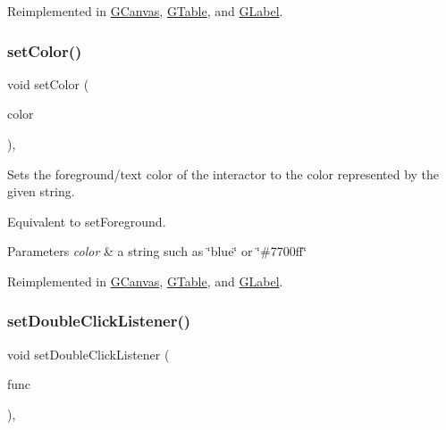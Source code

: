 Reimplemented in \mbox{\hyperlink{classGCanvas_af6e1bcf23a09a0ae0607daff81ee45fa}{G\+Canvas}}, \mbox{\hyperlink{classGTable_a165735fb49fa7db12602d32557cbfe0d}{G\+Table}}, and \mbox{\hyperlink{classGLabel_a165735fb49fa7db12602d32557cbfe0d}{G\+Label}}.

\mbox{\label{classGInteractor_a61374df6c11b52cfbb0815decdbaebc6}} 
\subsubsection{\texorpdfstring{set\+Color()}{setColor()}\hspace{0.1cm}{\footnotesize\ttfamily [2/2]}}
{\footnotesize\ttfamily void set\+Color (\begin{DoxyParamCaption}\item[{const std\+::string \&}]{color }\end{DoxyParamCaption})\hspace{0.3cm}{\ttfamily [virtual]}, {\ttfamily [inherited]}}



Sets the foreground/text color of the interactor to the color represented by the given string. 

Equivalent to set\+Foreground. 
\begin{DoxyParams}{Parameters}
{\em color} & a string such as \char`\"{}blue\char`\"{} or \char`\"{}\#7700ff\char`\"{} \\
\hline
\end{DoxyParams}


Reimplemented in \mbox{\hyperlink{classGCanvas_a56845b1accc47aa881d05939eef6996c}{G\+Canvas}}, \mbox{\hyperlink{classGTable_a56845b1accc47aa881d05939eef6996c}{G\+Table}}, and \mbox{\hyperlink{classGLabel_a56845b1accc47aa881d05939eef6996c}{G\+Label}}.

\mbox{\label{classGInteractor_ac29f9a3462458e165fae3a1f046ee77a}} 
\subsubsection{\texorpdfstring{set\+Double\+Click\+Listener()}{setDoubleClickListener()}\hspace{0.1cm}{\footnotesize\ttfamily [1/2]}}
{\footnotesize\ttfamily void set\+Double\+Click\+Listener (\begin{DoxyParamCaption}\item[{G\+Event\+Listener}]{func }\end{DoxyParamCaption})\hspace{0.3cm}{\ttfamily [virtual]}, {\ttfamily [inherited]}}



